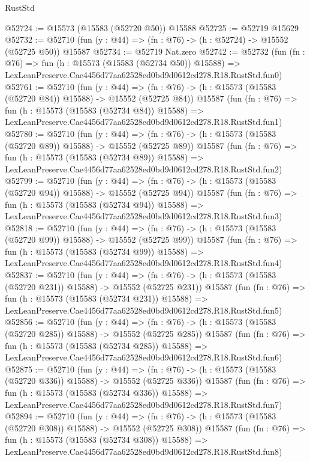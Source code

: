 \begin{lexlean}{RustStd}
\begin{coremodule}
@52724 := @15573 (@15583 (@52720 @50)) @15588
@52725 := @52719 @15629
@52732 := @52710 (fun (y : @44) => (fn : @76) -> (h : @52724) -> @15552 (@52725 @50)) @15587
@52734 := @52719 Nat.zero
@52742 := @52732
    (fun (fn : @76) =>
    fun (h : @15573 (@15583 (@52734 @50)) @15588) =>
    LexLeanPreserve.Cae4456d77aa62528ed0bd9d0612cd278.R18.RustStd.fun0)
@52761 := @52710
    (fun (y : @44) =>
    (fn : @76) -> (h : @15573 (@15583 (@52720 @84)) @15588) -> @15552 (@52725 @84))
    @15587
    (fun (fn : @76) =>
    fun (h : @15573 (@15583 (@52734 @84)) @15588) =>
    LexLeanPreserve.Cae4456d77aa62528ed0bd9d0612cd278.R18.RustStd.fun1)
@52780 := @52710
    (fun (y : @44) =>
    (fn : @76) -> (h : @15573 (@15583 (@52720 @89)) @15588) -> @15552 (@52725 @89))
    @15587
    (fun (fn : @76) =>
    fun (h : @15573 (@15583 (@52734 @89)) @15588) =>
    LexLeanPreserve.Cae4456d77aa62528ed0bd9d0612cd278.R18.RustStd.fun2)
@52799 := @52710
    (fun (y : @44) =>
    (fn : @76) -> (h : @15573 (@15583 (@52720 @94)) @15588) -> @15552 (@52725 @94))
    @15587
    (fun (fn : @76) =>
    fun (h : @15573 (@15583 (@52734 @94)) @15588) =>
    LexLeanPreserve.Cae4456d77aa62528ed0bd9d0612cd278.R18.RustStd.fun3)
@52818 := @52710
    (fun (y : @44) =>
    (fn : @76) -> (h : @15573 (@15583 (@52720 @99)) @15588) -> @15552 (@52725 @99))
    @15587
    (fun (fn : @76) =>
    fun (h : @15573 (@15583 (@52734 @99)) @15588) =>
    LexLeanPreserve.Cae4456d77aa62528ed0bd9d0612cd278.R18.RustStd.fun4)
@52837 := @52710
    (fun (y : @44) =>
    (fn : @76) -> (h : @15573 (@15583 (@52720 @231)) @15588) -> @15552 (@52725 @231))
    @15587
    (fun (fn : @76) =>
    fun (h : @15573 (@15583 (@52734 @231)) @15588) =>
    LexLeanPreserve.Cae4456d77aa62528ed0bd9d0612cd278.R18.RustStd.fun5)
@52856 := @52710
    (fun (y : @44) =>
    (fn : @76) -> (h : @15573 (@15583 (@52720 @285)) @15588) -> @15552 (@52725 @285))
    @15587
    (fun (fn : @76) =>
    fun (h : @15573 (@15583 (@52734 @285)) @15588) =>
    LexLeanPreserve.Cae4456d77aa62528ed0bd9d0612cd278.R18.RustStd.fun6)
@52875 := @52710
    (fun (y : @44) =>
    (fn : @76) -> (h : @15573 (@15583 (@52720 @336)) @15588) -> @15552 (@52725 @336))
    @15587
    (fun (fn : @76) =>
    fun (h : @15573 (@15583 (@52734 @336)) @15588) =>
    LexLeanPreserve.Cae4456d77aa62528ed0bd9d0612cd278.R18.RustStd.fun7)
@52894 := @52710
    (fun (y : @44) =>
    (fn : @76) -> (h : @15573 (@15583 (@52720 @308)) @15588) -> @15552 (@52725 @308))
    @15587
    (fun (fn : @76) =>
    fun (h : @15573 (@15583 (@52734 @308)) @15588) =>
    LexLeanPreserve.Cae4456d77aa62528ed0bd9d0612cd278.R18.RustStd.fun8)

\end{coremodule}
\end{lexlean}

